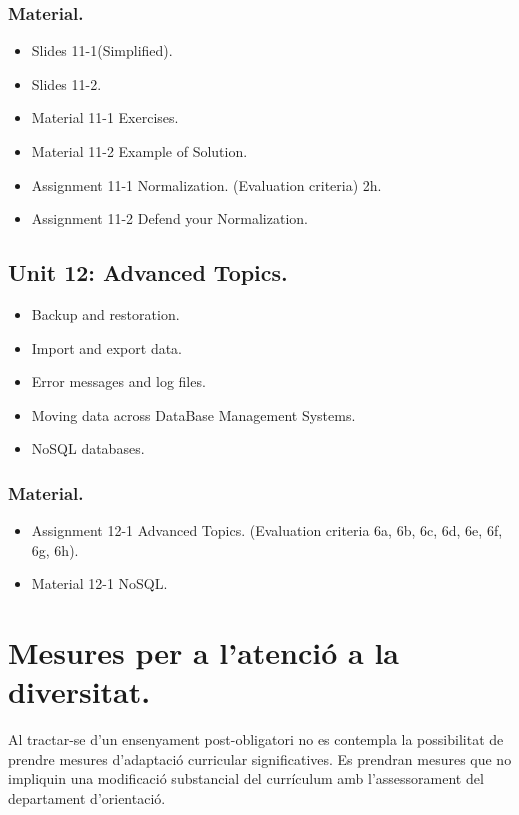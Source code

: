 \documentclass[catalan, a4paper, 12pt, titlepage]{article}
\begin{document}
  \subsubsection{Material.}
  \begin{itemize}
	  \item Slides 11-1(Simplified).
	  \item Slides 11-2.
	  \item Material 11-1 Exercises.
	  \item Material 11-2 Example of Solution.
	  \item Assignment 11-1 Normalization. (\faGraduationCap Evaluation criteria) 2h.
	  \item Assignment 11-2 Defend your Normalization.
  \end{itemize}


  \subsection{Unit 12: Advanced Topics.}

  \begin{itemize}
	\item Backup and restoration.
	\item Import and export data.
	\item Error messages and log files.
	\item Moving data across DataBase Management Systems.
	\item NoSQL databases.
  \end{itemize}

  \subsubsection{Material.}
  \begin{itemize}
	  \item Assignment 12-1 Advanced Topics. (\faGraduationCap Evaluation criteria 6a, 6b, 6c, 6d, 6e, 6f, 6g, 6h).
	  \item Material 12-1 NoSQL.
  \end{itemize}


\section{Mesures per a l'atenció a la diversitat.}
\label{sec:diversitat}

Al tractar-se d'un ensenyament post-obligatori no es contempla la possibilitat de prendre mesures d'adaptació curricular significatives. Es prendran mesures que no impliquin una modificació substancial del currículum amb l'assessorament del departament d'orientació.
\end{document}
